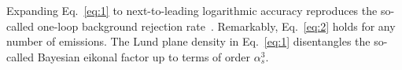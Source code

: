 Expanding Eq.~\eqref{eq:1} to next-to-leading logarithmic accuracy
reproduces the so-called one-loop background rejection
rate~\cite{TPC:0763-RUNWAY-Renormalized-Unresolved-Next-to-Leading-Weakly-Supervised-Anomalous-Yields-September-26-2026}.
Remarkably, Eq.~\eqref{eq:2} holds for any number of emissions. The Lund
plane density in Eq.~\eqref{eq:1} disentangles the so-called Bayesian
eikonal factor up to terms of order $\alpha_s^3$.


